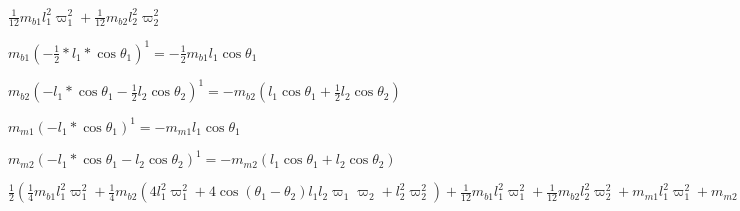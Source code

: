 \documentclass{article}
\begin{document}
$\frac{1}{12}m_{b1}l_{1}^{2}\varpi _{1}^{2} +\frac{1}{12}m_{b2}l_{2}^{2}\varpi _{2}^{2}$


$m_{b1}( -\frac{1}{2} \ast l_{1} \ast \cos \theta _{1})^{1} = -\frac{1}{2}m_{b 1}l_{1}\cos  \theta _{1}$


$m_{b2}( -l_{1} \ast \cos \theta _{1} -\frac{1}{2}l_{2}\cos \theta _{2})^{1} = -m_{b 2}\left (l_{1}\cos  \theta _{1} +\frac{1}{2}l_{2}\cos  \theta _{2}\right )$


$m_{m1}( -l_{1} \ast \cos \theta _{1})^{1} = -m_{m 1}l_{1}\cos  \theta _{1}$


$m_{m2}( -l_{1} \ast \cos \theta _{1} -l_{2}\cos \theta _{2})^{1} = -m_{m 2}\left (l_{1}\cos  \theta _{1} +l_{2}\cos  \theta _{2}\right )$


$\frac{1}{2}(\frac{1}{4}m_{b 1}l_{1}^{2}\varpi _{1}^{2} +\frac{1}{4}m_{b 2}\left (4l_{1}^{2}\varpi _{1}^{2} +4\cos  \left (\theta _{1} -\theta _{2}\right )l_{1}l_{2}\varpi _{1}\varpi _{2} +l_{2}^{2}\varpi _{2}^{2}\right ) +\frac{1}{12}m_{b1}l_{1}^{2}\varpi _{1}^{2} +\frac{1}{12}m_{b2}l_{2}^{2}\varpi _{2}^{2} +m_{m 1}l_{1}^{2}\varpi _{1}^{2} +m_{m 2}\left (l_{1}^{2}\varpi _{1}^{2} +2\cos  \left (\theta _{1} -\theta _{2}\right )l_{1}l_{2}\varpi _{1}\varpi _{2} +l_{2}^{2}\varpi _{2}^{2}\right )) -g( -\frac{1}{2}m_{b 1}l_{1}\cos  \theta _{1} -m_{b 2}\left (l_{1}\cos  \theta _{1} +\frac{1}{2}l_{2}\cos  \theta _{2}\right ) -m_{m 1}l_{1}\cos  \theta _{1} -m_{m 2}\left (l_{1}\cos  \theta _{1} +l_{2}\cos  \theta _{2}\right )) =\frac{1}{6}m_{b 1}l_{1}^{2}\varpi _{1}^{2} +\frac{1}{2}m_{m 1}l_{1}^{2}\varpi _{1}^{2} +\frac{1}{2}m_{m 2}l_{1}^{2}\varpi _{1}^{2} +\frac{1}{2}m_{m 2}l_{2}^{2}\varpi _{2}^{2} +\frac{1}{2}l_{1}^{2}\varpi _{1}^{2}m_{b 2} +\frac{1}{6}l_{2}^{2}m_{b 2}\varpi _{2}^{2} +\frac{1}{2}gm_{b 1}l_{1}\cos  \theta _{1} +gm_{m 1}l_{1}\cos  \theta _{1} +gm_{m 2}l_{1}\cos  \theta _{1} +gm_{m 2}l_{2}\cos  \theta _{2} +gl_{1}m_{b 2}\cos  \theta _{1} +\frac{1}{2}gl_{2}m_{b 2}\cos  \theta _{2} +m_{m 2}l_{1}l_{2}\varpi _{1}\varpi _{2}\cos  \left (\theta _{1} -\theta _{2}\right ) +\frac{1}{2}l_{1}l_{2}\varpi _{1}m_{b 2}\varpi _{2}\cos  \left (\theta _{1} -\theta _{2}\right )$
\end{document}
